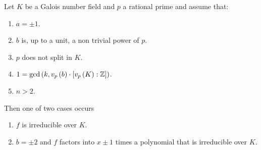 \documentclass[../main.tex]{subfiles}
\begin{document}
\begin{lemma}
  \label{lem:no_splitting_irreducibility}
  Let $K$ be a Galois number field and $p$ a rational prime and assume that:
  \begin{enumerate}
    \item $a = \pm 1$.
    \item $b$ is, up to a unit, a non trivial power of $p$.
    \item $p$ does not split in $K$.
    \item \label{item:valuation_coprimality}$
      1 = \gcd\left( 
        k, 
        v_p\left( b \right) \cdot \left[ v_p\left( K \right): \mathbb{Z} \right]
      \right)
    $.
    \item $n > 2$.
  \end{enumerate}
  Then one of two cases occurs
  \begin{enumerate}
    \item $f$ is irreducible over $K$.
    \item $b = \pm 2$ and $f$ factors into $x \pm 1$ times a polynomial that is irreducible over $K$.
  \end{enumerate}
\end{lemma}
\end{document}
